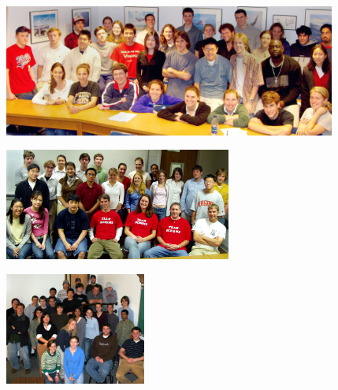 \begin{center}
\includegraphics[width=4.3in]{images/cs200-spring2003-edited.jpg}
\end{center}

\begin{minipage}[c]{2.7in}
\center
\includegraphics[height=1.45in]{images/cs200-spring2004-edited.jpg}
\end{minipage}
\quad
\begin{minipage}[c]{2.4in}
\center
\includegraphics[height=1.45in]{images/cs150-fall2005-edited.jpg}
\end{minipage}
